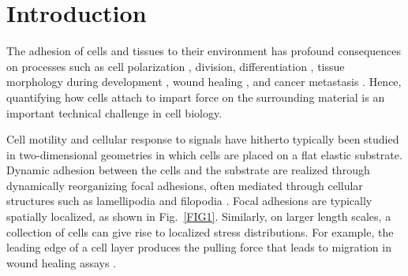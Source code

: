 \documentclass[aps,prl,reprint,groupedaddress,twocolumn]{revtex4-1}
\begin{document}

\section{Introduction}

The adhesion of cells and tissues to their environment has profound
consequences on processes such as cell polarization \cite{MASHA2011},
division, differentiation \cite{DIFFERENTIATION0}, tissue morphology
during development \cite{DEVELOPMENT0}, wound healing
\cite{WOUND0,WOUND2,WOUND1}, and cancer metastasis
\cite{CANCER0}. Hence, quantifying how cells attach to impart force
on the surrounding material is an important technical challenge in
cell biology.

Cell motility and cellular response to signals have hitherto typically
been studied in two-dimensional geometries in which cells are placed
on a flat elastic substrate.  Dynamic adhesion between the cells and
the substrate are realized through dynamically reorganizing focal
adhesions, often mediated through cellular structures such as
lamellipodia and filopodia \cite{MBOC}. Focal adhesions are typically
spatially localized, as shown in Fig.~\ref{FIG1}. Similarly, on larger
length scales, a collection of cells can give rise to localized stress
distributions. For example, the leading edge of a cell layer produces
the pulling force that leads to migration in wound healing assays
\cite{WOUND0,WOUND1,WOUND2}.
\end{document}
